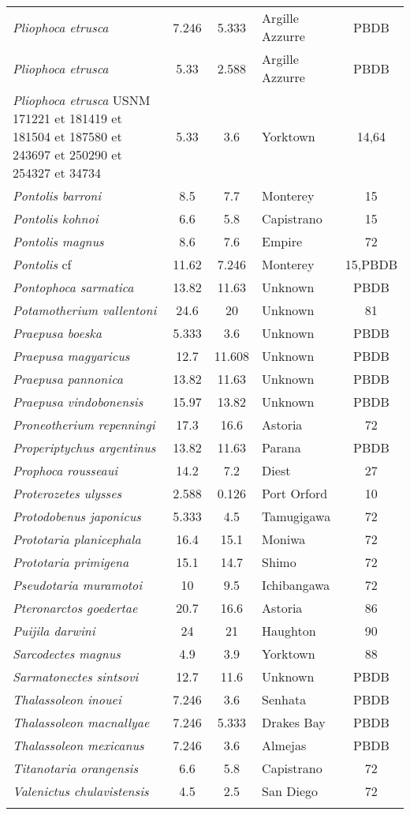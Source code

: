 \begin{longtable}{p{}cclc}
\textit{Pliophoca etrusca} & 	7.246	&	5.333	&	Argille Azzurre	&PBDB\\
\textit{Pliophoca etrusca} & 	5.33	&	2.588	&	Argille Azzurre	&PBDB\\
\textit{Pliophoca etrusca} USNM 171221 et 181419 et 181504 et 187580 et 243697 et 250290 et 254327 et 34734 & 	5.33	&	3.6	&	Yorktown	&14,64\\
\textit{Pontolis barroni} & 	8.5	&	7.7	&	Monterey	&15\\
\textit{Pontolis kohnoi} & 	6.6	&	5.8	&	Capistrano	&15\\
\textit{Pontolis magnus} & 	8.6	&	7.6	&	Empire	&72\\
\textit{Pontolis} cf & 	11.62	&	7.246	&	Monterey	&15,PBDB\\
\textit{Pontophoca sarmatica} & 	13.82	&	11.63	&	Unknown	&PBDB\\
\textit{Potamotherium vallentoni} & 	24.6	&	20	&	Unknown	&81\\
\textit{Praepusa boeska} & 	5.333	&	3.6	&	Unknown	&PBDB\\
\textit{Praepusa magyaricus} & 	12.7	&	11.608	&	Unknown	&PBDB\\
\textit{Praepusa pannonica} & 	13.82	&	11.63	&	Unknown	&PBDB\\
\textit{Praepusa vindobonensis} & 	15.97	&	13.82	&	Unknown	&PBDB\\
\textit{Proneotherium repenningi} & 	17.3	&	16.6	&	Astoria	&72\\
\textit{Properiptychus argentinus} & 	13.82	&	11.63	&	Parana	&PBDB\\
\textit{Prophoca rousseaui} & 	14.2	&	7.2	&	Diest	&27\\
\textit{Proterozetes ulysses} & 	2.588	&	0.126	&	Port Orford	&10\\
\textit{Protodobenus japonicus} & 	5.333	&	4.5	&	Tamugigawa	&72\\
\textit{Prototaria planicephala} & 	16.4	&	15.1	&	Moniwa	&72\\
\textit{Prototaria primigena} & 	15.1	&	14.7	&	Shimo	&72\\
\textit{Pseudotaria muramotoi} & 	10	&	9.5	&	Ichibangawa	&72\\
\textit{Pteronarctos goedertae} & 	20.7	&	16.6	&	Astoria	&86\\
\textit{Puijila darwini} & 	24	&	21	&	Haughton	&90\\
\textit{Sarcodectes magnus} & 	4.9	&	3.9	&	Yorktown	&88\\
\textit{Sarmatonectes sintsovi} & 	12.7	&	11.6	&	Unknown	&PBDB\\
\textit{Thalassoleon inouei} & 	7.246	&	3.6	&	Senhata	&PBDB\\
\textit{Thalassoleon macnallyae} & 	7.246	&	5.333	&	Drakes Bay	&PBDB\\
\textit{Thalassoleon mexicanus} & 	7.246	&	3.6	&	Almejas	&PBDB\\
\textit{Titanotaria orangensis} & 	6.6	&	5.8	&	Capistrano	&72\\
\textit{Valenictus chulavistensis} & 	4.5	&	2.5	&	San Diego	&72\\
\hline
\label{table-stratigraphy}
\end{longtable}